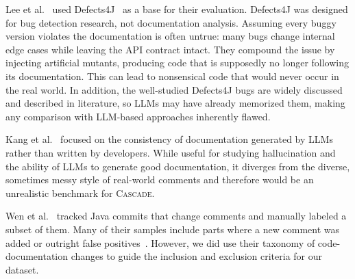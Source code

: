 \documentclass[acmsmall, screen]{acmart}
\newcommand{\tool}{\textsc{Cascade}\xspace}
\begin{document}
Lee et al.~\cite{metamon} used Defects4J~\cite{defects4j} as a base for their evaluation. Defects4J was designed for bug detection research, not documentation analysis. Assuming every buggy version violates the documentation is often untrue: many bugs change internal edge cases while leaving the API contract intact. They compound the issue by injecting artificial mutants, producing code that is supposedly no longer following its documentation. This can lead to nonsensical code that would never occur in the real world. In addition, the well-studied Defects4J bugs are widely discussed and described in literature,
so LLMs may have already memorized them, making any comparison with LLM-based approaches inherently flawed.

Kang et al.~\cite{sungmin} focused on the consistency of documentation generated by LLMs rather than written by developers. While useful for studying hallucination and the ability of LLMs to generate good documentation, it diverges from the diverse, sometimes messy style of real-world comments and therefore would be an unrealistic benchmark for \tool.

Wen et al.~\cite{wen2019large} tracked Java commits that change comments and manually labeled a subset of them. Many of their samples include parts where a new comment was added or outright false positives~\cite{upDoc}.
However, we did use their taxonomy of code-documentation changes to guide the inclusion and exclusion criteria for our dataset.
\end{document}
